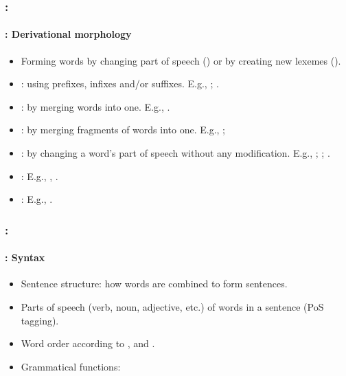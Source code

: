 \documentclass[xcolor=table]{beamer}
\begin{document}
\begin{frame}
	\frametitle{\insertshortsubtitle: \insertsection}
	\framesubtitle{\insertsubsection: Derivational morphology}

	\begin{itemize}
		\item Forming words by changing part of speech () or by creating new lexemes ().
		
		\item {}: using prefixes, infixes and/or suffixes. 
		E.g., ; .
		
		\item {}: by merging words into one.
		E.g., .
		
		\item {}: by merging fragments of words into one.
		E.g., ; 
		
		\item {}: by changing a word's part of speech without any modification. 
		E.g., ; ; .
		
		\item {}:
		E.g., , .
		
		\item {}: E.g., .
		
	\end{itemize}

\end{frame}

\begin{frame}
	\frametitle{\insertshortsubtitle: \insertsection}
	\framesubtitle{\insertsubsection: Syntax}

	\begin{itemize}
		\item Sentence structure: how words are combined to form sentences.
		\item Parts of speech (verb, noun, adjective, etc.) of words in a sentence (PoS tagging).
		\item Word order according to ,  and .
		\item Grammatical functions: 
	\end{itemize}

\end{frame}
\end{document}
